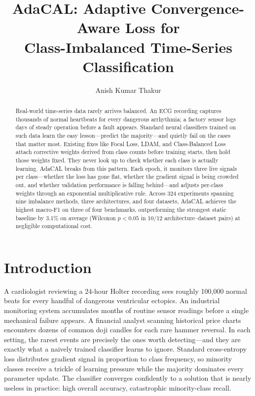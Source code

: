 \documentclass[letterpaper]{article}
\title{AdaCAL: Adaptive Convergence-Aware Loss for\\Class-Imbalanced Time-Series Classification}
\author{Anish Kumar Thakur}
\begin{document}
\maketitle

\begin{abstract}
Real-world time-series data rarely arrives balanced. An ECG recording captures thousands of normal heartbeats for every dangerous arrhythmia; a factory sensor logs days of steady operation before a fault appears. Standard neural classifiers trained on such data learn the easy lesson---predict the majority---and quietly fail on the cases that matter most. Existing fixes like Focal Loss, LDAM, and Class-Balanced Loss attach corrective weights derived from class counts before training starts, then hold those weights fixed. They never look up to check whether each class is actually learning. AdaCAL breaks from this pattern. Each epoch, it monitors three live signals per class---whether the loss has gone flat, whether the gradient signal is being crowded out, and whether validation performance is falling behind---and adjusts per-class weights through an exponential multiplicative rule. Across 324 experiments spanning nine imbalance methods, three architectures, and four datasets, AdaCAL achieves the highest macro-F1 on three of four benchmarks, outperforming the strongest static baseline by 3.1\% on average (Wilcoxon $p < 0.05$ in 10/12 architecture--dataset pairs) at negligible computational cost.
\end{abstract}

\section{Introduction}

A cardiologist reviewing a 24-hour Holter recording sees roughly 100{,}000 normal beats for every handful of dangerous ventricular ectopics. An industrial monitoring system accumulates months of routine sensor readings before a single mechanical failure appears. A financial analyst scanning historical price charts encounters dozens of common doji candles for each rare hammer reversal. In each setting, the rarest events are precisely the ones worth detecting---and they are exactly what a naively trained classifier learns to ignore. Standard cross-entropy loss distributes gradient signal in proportion to class frequency, so minority classes receive a trickle of learning pressure while the majority dominates every parameter update. The classifier converges confidently to a solution that is nearly useless in practice: high overall accuracy, catastrophic minority-class recall.
\end{document}
